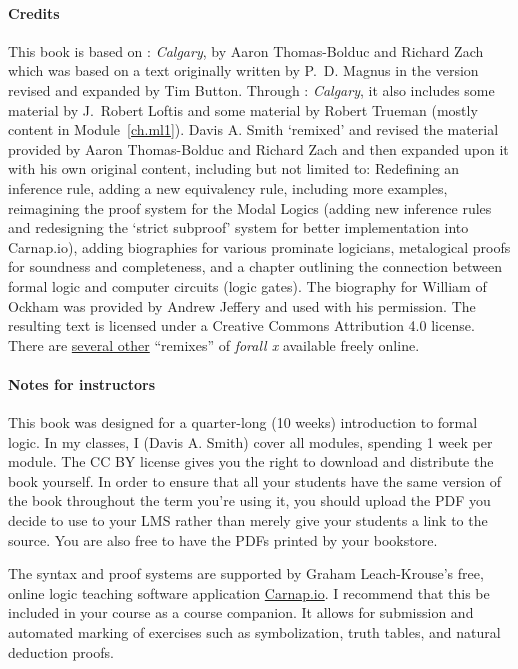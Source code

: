 \paragraph{Credits} This book is based on \forallx: \emph{Calgary}, by Aaron Thomas-Bolduc and Richard Zach which was based on a text originally written by P.~D. Magnus in the version revised and expanded by Tim Button. Through \forallx: \emph{Calgary}, it also includes some material by J.~Robert Loftis and some material by Robert Trueman (mostly content in Module~\ref{ch.ml1}). Davis A. Smith `remixed' and revised the material provided by Aaron Thomas-Bolduc and Richard Zach and then expanded upon it with his own original content, including but not limited to: Redefining an inference rule, adding a new equivalency rule, including more examples, reimagining the proof system for the Modal Logics (adding new inference rules and redesigning the `strict subproof' system for better implementation into Carnap.io), adding biographies for various prominate logicians, metalogical proofs for soundness and completeness, and a chapter outlining the connection between formal logic and computer circuits (logic gates). The biography for William of Ockham was provided by Andrew Jeffery and used with his permission. The resulting text is licensed under a Creative Commons Attribution 4.0 license. There are \href{https://github.com/OpenLogicProject/OpenLogic/wiki/Other-Logic-Textbooks}{several other} ``remixes'' of \emph{forall x} available freely online.

\paragraph{Notes for instructors} This book was designed for a quarter-long (10 weeks) introduction to formal logic. In my classes, I (Davis A. Smith) cover all modules, spending 1 week per module. 
The CC BY license gives you the right to download and distribute the book yourself. In order to ensure that all your students have the same version of the book throughout the term you're using it, you should upload the PDF you decide to use to your LMS rather than merely give your students a link to the source. You are also free to have the PDFs printed by your bookstore.

The syntax and proof systems are supported by Graham Leach-Krouse's free, online logic teaching software application \href{https://carnap.io}{Carnap.io}. I recommend that this be included in your course as a course companion. It allows for submission and automated marking of exercises such as symbolization, truth tables, and natural deduction proofs.